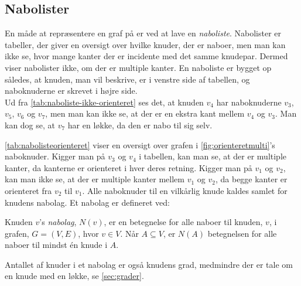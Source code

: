 \subsection{Nabolister}
En måde at repræsentere en graf på er ved at lave en \emph{naboliste}. Nabolister er tabeller, der giver en oversigt over hvilke knuder, der er naboer, men man kan ikke se, hvor mange kanter der er incidente med det samme knudepar. Dermed viser nabolister ikke, om der er multiple kanter. En naboliste er bygget op således, at knuden, man vil beskrive, er i venstre side af tabellen, og naboknuderne er skrevet i højre side. \\




Ud fra \autoref{tab:naboliste-ikke-orienteret} ses det, at knuden $v_4$ har naboknuderne $v_3$, $v_5$, $v_6$ og $v_7$, men man kan ikke se, at der er en ekstra kant mellem $v_4$ og $v_3$. Man kan dog se, at $v_7$ har en løkke, da den er nabo til sig selv.


\autoref{tab:nabolisteorienteret} viser en oversigt over grafen i \autoref{fig:orienteretmulti}'s naboknuder. Kigger man på $v_3$ og $v_4$ i tabellen, kan man se, at der er multiple kanter, da kanterne er orienteret i hver deres retning. Kigger man på $v_1$ og $v_2$, kan man ikke se, at der er multiple kanter mellem $v_1$ og $v_2$, da begge kanter er orienteret fra $v_2$ til $v_1$. Alle naboknuder til en vilkårlig knude kaldes samlet for knudens nabolag. Et nabolag er defineret ved:

\begin{defn}[Nabolag] \label{defn:nabolag}
Knuden $v$'s \emph{nabolag}, $N(v)$, er en betegnelse for alle naboer til knuden, $v$, i grafen, $G=(V,E)$, hvor $v \in V$. Når $A \subseteq V$, er $N(A)$ betegnelsen for alle naboer til mindst én knude i $A$.
\end{defn}

Antallet af knuder i et nabolag er også knudens grad, medmindre der er tale om en knude med en løkke, se \autoref{sec:grader}. 
